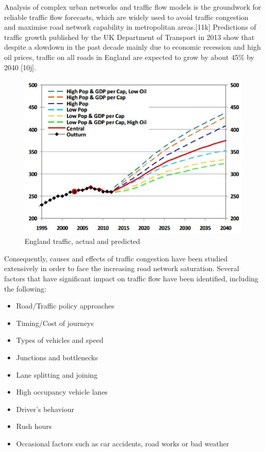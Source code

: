 \documentclass[11pt]{article}
\begin{document}
Analysis of complex urban networks and traffic flow models is the groundwork for reliable traffic flow forecasts, which are widely used to avoid traffic congestion and maximise road network capability in metropolitan areas.[11k] Predictions of traffic growth published by the UK Department of Transport in 2013 show that despite a slowdown in the past decade mainly due to economic recession and high oil prices, traffic on all roads in England are expected to grow by about 45\% by 2040 [10j]. 


\begin{figure}[h]
\begin{center}
\includegraphics[scale=0.7]{england_traffic}
\caption{England traffic, actual and predicted}
\end{center}
\end{figure}


Consequently, causes and effects of traffic congestion have been studied extensively in order to face the increasing road network saturation. Several factors that have significant impact on traffic flow have been identified, including the following: 
\begin{singlespace}
\begin{itemize}\itemsep0pt
\item Road/Traffic policy approaches
\item Timing/Cost of journeys
\item Types of vehicles and speed
\item Junctions and bottlenecks
\item Lane splitting and joining
\item High occupancy vehicle lanes
\item Driver\textquoteright s behaviour
\item Rush hours
\item Occasional factors such as car accidents, road works or bad weather
\end{itemize}
\end{singlespace}
\end{document}
